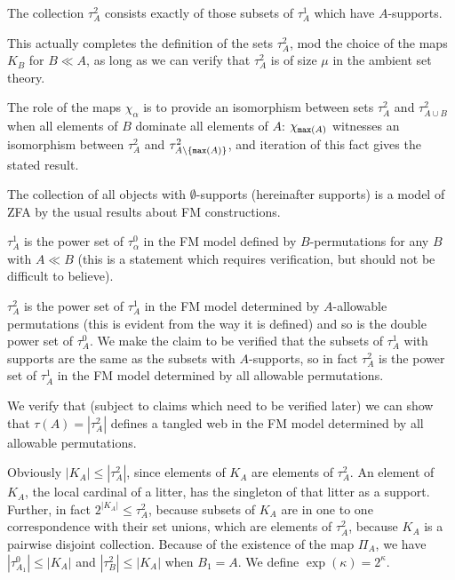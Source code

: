 \documentclass{slides}
\begin{document}
\begin{slide}

The collection $\tau^2_A$ consists exactly of those subsets of $\tau^1_A$ which have $A$-supports.

This actually completes the definition of the sets $\tau^2_A$, mod the choice of the maps $K_B$ for $B \ll A$, as long as we can verify that $\tau^2_A$ is of size $\mu$
in the ambient set theory.

The role of the maps $\chi_{\alpha}$ is to provide an isomorphism between sets $\tau^2_A$ and $\tau^2_{A \cup B}$ when all elements of $B$ dominate all elements of $A$:
$\chi_{{\tt max}(A)}$ witnesses an isomorphism between $\tau^2_A$ and $\tau^2_{A \setminus \{{\tt max}(A)\}}$, and iteration of this fact gives the stated result.

\end{slide}

\begin{slide}

The collection of all objects with $\emptyset$-supports (hereinafter supports) is a model of ZFA by the usual results about FM constructions.

$\tau^1_A$ is the power set of $\tau^0_\alpha$ in the FM model defined by $B$-permutations for any $B$ with $A \ll B$ (this is a statement which requires verification, but should not be difficult to believe).

$\tau^2_A$ is the power set of $\tau^1_A$ in the FM model determined by $A$-allowable permutations (this is evident from the way it is defined) and so is the double power set of $\tau^0_A$.  We make the claim to be verified that the subsets of $\tau^1_A$ with supports are the same as the subsets with $A$-supports, so in fact $\tau^2_A$ is the power set of $\tau^1_A$ in the FM model determined by all allowable permutations.

\end{slide}

\begin{slide}

We verify that (subject to claims which need to be verified later) we can show that $\tau(A) = |\tau^2_A|$ defines a tangled web in the FM model determined by all allowable permutations.

Obviously $|K_A| \leq |\tau^2_A|$, since elements of $K_A$ are elements of $\tau^2_A$.  An element of $K_A$, the local cardinal of a litter, has the singleton of that litter
as a support.  Further, in fact $2^{|K_A|} \leq \tau^2_A$, because subsets of $K_A$ are in one to one correspondence with their set unions, which are elements of
$\tau^2_A$, because $K_A$ is a pairwise disjoint collection.  Because of the existence of the map $\Pi_A$, we have $|\tau^0_{A_1}| \leq |K_A|$ and
$|\tau^2_B| \leq |K_A|$ when $B_1=A$.  We define $\exp(\kappa) = 2^\kappa$.

\end{slide}
\end{document}
